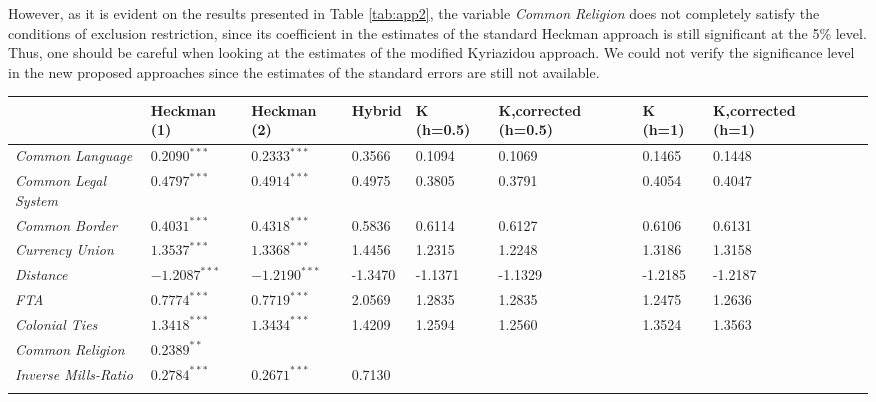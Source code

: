 However, as it is evident on the results presented in Table \ref{tab:app2}, the variable \textit{Common Religion} does not completely satisfy the conditions of exclusion restriction, since its coefficient in the estimates of the standard Heckman approach is still significant at the 5\% level. Thus, one should be careful when looking at the estimates of the modified Kyriazidou approach. We could not verify the significance level in the new proposed approaches since the estimates of the standard errors are still not available.
\begin{sidewaystable}
        \small
        \centering
        \begin{tabular}{p{4cm}p{1.8cm}p{1.8cm}p{1.8cm}p{1.8cm}p{1.8cm}p{1.8cm}p{1.8cm}p{1.8cm}p{1.8cm}}
          \hline
           \quad  &Heckman (1) & Heckman (2) &Hybrid  & K (h=0.5)  & K,corrected (h=0.5)  & K (h=1)  & K,corrected (h=1)\\
           \hline
            \textit{Common Language}  & $0.2090^{***}$ & $0.2333^{***}$& 0.3566 & 0.1094 & 0.1069&  0.1465& 0.1448\\
            \textit{Common Legal System}  & $0.4797^{***}$ & $0.4914^{***}$& 0.4975 & 0.3805& 0.3791& 0.4054& 0.4047\\
            \textit{Common Border}  & $0.4031^{***}$ & $0.4318^{***}$ & 0.5836& 0.6114 & 0.6127& 0.6106& 0.6131\\
            \textit{Currency Union}   & $1.3537^{***}$ & $1.3368^{***}$ & 1.4456 & 1.2315& 1.2248& 1.3186& 1.3158\\
            \textit{Distance}   & $-1.2087^{***}$ & $-1.2190^{***}$& -1.3470& -1.1371& -1.1329& -1.2185& -1.2187\\
            \textit{FTA}  &  $0.7774^{***}$ & $0.7719^{***}$& 2.0569 & 1.2835& 1.2835& 1.2475& 1.2636\\
            \textit{Colonial Ties}  & $1.3418^{***}$ & $1.3434^{***}$ & 1.4209 & 1.2594 &1.2560 & 1.3524& 1.3563\\
            \textit{Common Religion}  &  $0.2389^{**}$ &  &  &  &  &  & \\
            \textit{Inverse Mills-Ratio}  & $0.2784^{***}$ & $0.2671^{***}$ & 0.7130& & & &\\
             &  & & & & & &\\
            \hline
        \end{tabular}
        \caption{\footnotesize{Estimates for the second stage Equation \ref{eq:app2}. For the Heckman and Hybrid estimates we consider importer and exporter fixed effects, correcting for the perfect prediction problem. We denote by Kyriazidou by $K$. \newline \textsuperscript{*} indicates that the coefficient is significant at the 10 \% level \newline \textsuperscript{**} indicates that the coefficient is significant at the 5 \% level \newline \textsuperscript{***} indicates that the coefficient is significant at the 1 \% level.}}
        \label{tab:app2}
\end{sidewaystable}
